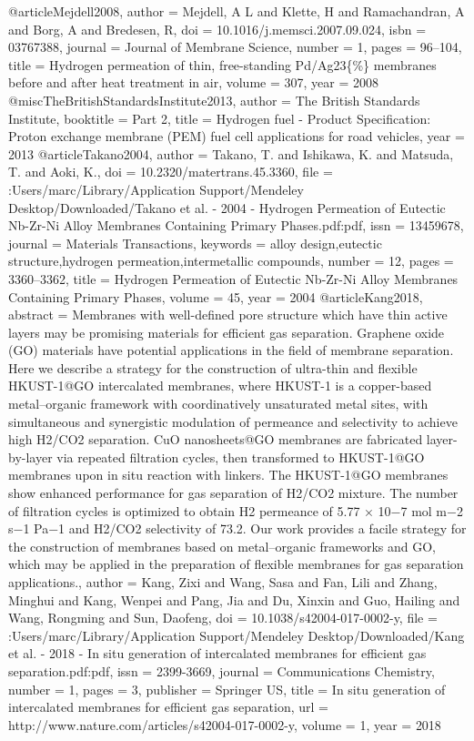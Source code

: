 @article{Mejdell2008,
author = {Mejdell, A L and Klette, H and Ramachandran, A and Borg, A and Bredesen, R},
doi = {10.1016/j.memsci.2007.09.024},
isbn = {03767388},
journal = {Journal of Membrane Science},
number = {1},
pages = {96--104},
title = {{Hydrogen permeation of thin, free-standing Pd/Ag23{\{}{\%}{\}} membranes before and after heat treatment in air}},
volume = {307},
year = {2008}
}
@misc{TheBritishStandardsInstitute2013,
author = {{The British Standards Institute}},
booktitle = {Part 2},
title = {{Hydrogen fuel - Product Specification: Proton exchange membrane (PEM) fuel cell applications for road vehicles}},
year = {2013}
}
@article{Takano2004,
author = {Takano, T. and Ishikawa, K. and Matsuda, T. and Aoki, K.},
doi = {10.2320/matertrans.45.3360},
file = {:Users/marc/Library/Application Support/Mendeley Desktop/Downloaded/Takano et al. - 2004 - Hydrogen Permeation of Eutectic Nb-Zr-Ni Alloy Membranes Containing Primary Phases.pdf:pdf},
issn = {13459678},
journal = {Materials Transactions},
keywords = {alloy design,eutectic structure,hydrogen permeation,intermetallic compounds},
number = {12},
pages = {3360--3362},
title = {{Hydrogen Permeation of Eutectic Nb-Zr-Ni Alloy Membranes Containing Primary Phases}},
volume = {45},
year = {2004}
}
@article{Kang2018,
abstract = {Membranes with well-defined pore structure which have thin active layers may be promising materials for efficient gas separation. Graphene oxide (GO) materials have potential applications in the field of membrane separation. Here we describe a strategy for the construction of ultra-thin and flexible HKUST-1@GO intercalated membranes, where HKUST-1 is a copper-based metal–organic framework with coordinatively unsaturated metal sites, with simultaneous and synergistic modulation of permeance and selectivity to achieve high H2/CO2 separation. CuO nanosheets@GO membranes are fabricated layer-by-layer via repeated filtration cycles, then transformed to HKUST-1@GO membranes upon in situ reaction with linkers. The HKUST-1@GO membranes show enhanced performance for gas separation of H2/CO2 mixture. The number of filtration cycles is optimized to obtain H2 permeance of 5.77 × 10−7 mol m−2 s−1 Pa−1 and H2/CO2 selectivity of 73.2. Our work provides a facile strategy for the construction of membranes based on metal–organic frameworks and GO, which may be applied in the preparation of flexible membranes for gas separation applications.},
author = {Kang, Zixi and Wang, Sasa and Fan, Lili and Zhang, Minghui and Kang, Wenpei and Pang, Jia and Du, Xinxin and Guo, Hailing and Wang, Rongming and Sun, Daofeng},
doi = {10.1038/s42004-017-0002-y},
file = {:Users/marc/Library/Application Support/Mendeley Desktop/Downloaded/Kang et al. - 2018 - In situ generation of intercalated membranes for efficient gas separation.pdf:pdf},
issn = {2399-3669},
journal = {Communications Chemistry},
number = {1},
pages = {3},
publisher = {Springer US},
title = {{In situ generation of intercalated membranes for efficient gas separation}},
url = {http://www.nature.com/articles/s42004-017-0002-y},
volume = {1},
year = {2018}
}
